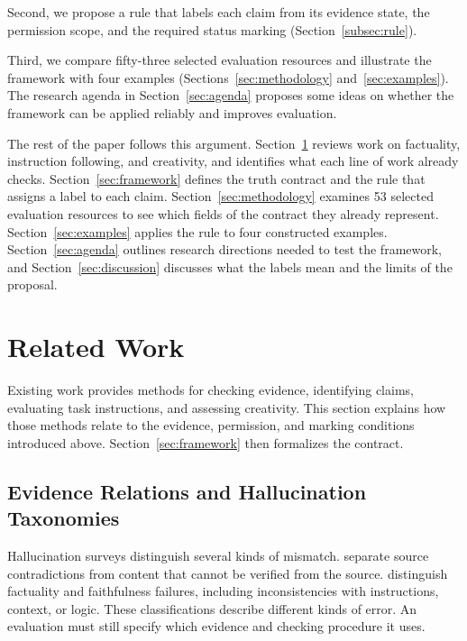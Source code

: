 \documentclass{clv2025}
\begin{document}
Second, we propose a rule that labels each claim from its evidence state,
the permission scope, and the required status marking
(Section~\ref{subsec:rule}).


Third, we compare fifty-three selected evaluation resources and illustrate the
framework with four examples
(Sections~\ref{sec:methodology} and~\ref{sec:examples}).
The research agenda in Section~\ref{sec:agenda} proposes some ideas on whether the framework can be applied reliably and improves evaluation.

The rest of the paper follows this argument.
Section~\ref{sec:related} reviews work on factuality, instruction
following, and creativity, and identifies what each line of work already
checks. Section~\ref{sec:framework} defines the truth contract and the rule
that assigns a label to each claim. Section~\ref{sec:methodology} examines
53 selected evaluation resources to see which fields of the contract they
already represent. Section~\ref{sec:examples} applies the rule to four
constructed examples. Section~\ref{sec:agenda} outlines research directions needed to test the framework, and Section~\ref{sec:discussion} discusses what the
labels mean and the limits of the proposal.

\section{Related Work}\label{sec:related}

Existing work provides methods for checking evidence, identifying claims,
evaluating task instructions, and assessing creativity. This section explains
how those methods relate to the evidence, permission, and marking conditions
introduced above. Section~\ref{sec:framework} then formalizes the contract.

\subsection{Evidence Relations and Hallucination Taxonomies}

Hallucination surveys distinguish several kinds of mismatch.
\citet{ji_survey_2023} separate source contradictions from content that cannot
be verified from the source. \citet{huang_survey_2025} distinguish factuality
and faithfulness failures, including inconsistencies with instructions,
context, or logic. These classifications describe different kinds of error.
An evaluation must still specify which evidence and checking procedure it uses.
\end{document}
